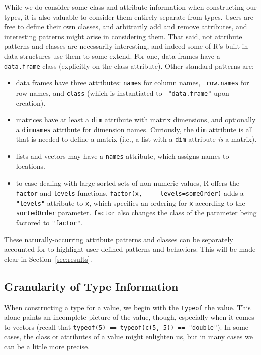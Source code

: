 \documentclass[acmsmall,10pt,review,anonymous]{acmart}\settopmatter{printfolios=true,printccs=false,printacmref=false}
\newcommand{\code}[1]{\lstinline|#1|\xspace}
\begin{document}
While we do consider some class and attribute information when constructing our types, it is also valuable to consider them entirely separate from types.
Users are free to define their own classes, and arbitrarily add and remove attributes, and interesting patterns might arise in considering them.
That said, not attribute patterns and classes are necessarily interesting, and indeed some of R's built-in data structures use them to some extend.
For one, data frames have a {\tt data.frame} class (explicitly on the class attribute).
Other standard patterns are:

\begin{itemize}

\item data frames have three attributes: {\tt names} for column names, {\tt
  row.names} for row names, and {\tt class} (which is instantiated to {\tt
  "data.frame"} upon creation).
	
\item matrices have at least a {\tt dim} attribute with matrix dimensions,
  and optionally a {\tt dimnames} attribute for dimension names. Curiously, the {\tt dim} attribute is all that is needed to define a matrix (i.e., a list with a {\tt dim} attribute {\it is} a matrix).

\item lists and vectors may have a {\tt names} attribute, which assigns
  names to locations.
	
\item to ease dealing with large sorted sets of non-numeric values, R offers
  the \code{factor} and \code{levels} functions.  \code{factor(x,
    levels=someOrder)} adds a {\tt "levels"} attribute to \code{x}, which
  specifies an ordering for \code{x} according to the \code{sortedOrder}
  parameter.  \code{factor} also changes the class of the parameter being
  factored to \texttt{"factor"}.

\end{itemize}

These naturally-occurring attribute patterns and classes can be separately
accounted for to highlight user-defined patterns and behaviors.  This will
be made clear in Section~\ref{sec:results}.

%
%
%
%
\subsection{Granularity of Type Information}

When constructing a type for a value, we begin with the {\tt typeof} the value.
This alone paints an incomplete picture of the value, though, especially when it comes to vectors (recall that \code{typeof(5) == typeof(c(5, 5)) == "double"}).
In some cases, the class or attributes of a value might enlighten us, but in many cases we can be a little more precise.
\end{document}
